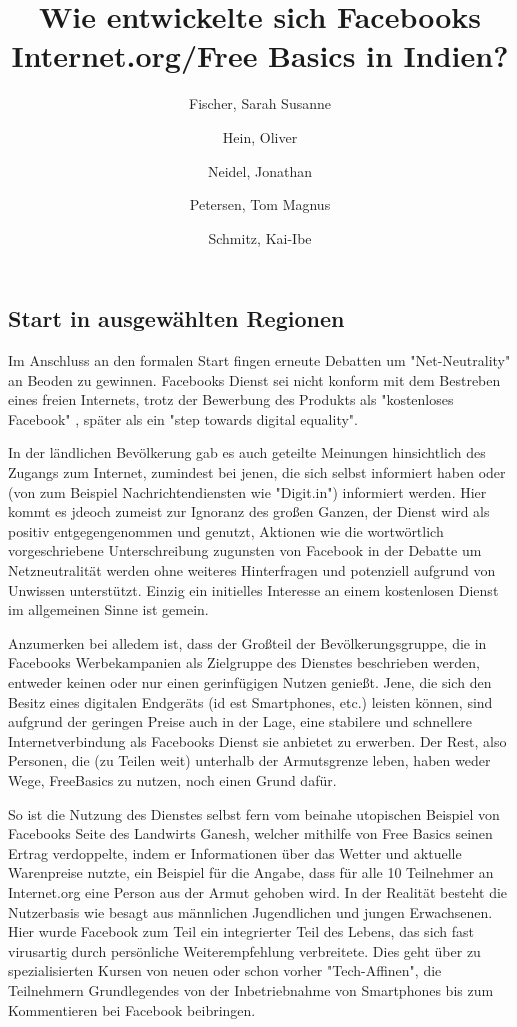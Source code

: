 \documentclass{article}
\title{Wie entwickelte sich Facebooks Internet.org/Free Basics in Indien?}
\author{
  Fischer, Sarah Susanne\\
  \and
  Hein, Oliver\\
  \and
  Neidel, Jonathan\\
  \and
  Petersen, Tom Magnus\\
  \and
  Schmitz, Kai-Ibe\\
}
\begin{document}
\maketitle
\subsection{Start in ausgewählten Regionen}

Im Anschluss an den formalen Start fingen erneute Debatten um "Net-Neutrality" an Beoden zu gewinnen. Facebooks Dienst sei nicht konform mit dem Bestreben eines freien Internets, trotz der Bewerbung des Produkts als "kostenloses Facebook"\cite[3]{prasad2017}
 , später als ein "step towards digital equality".

\medskip

In der ländlichen Bevölkerung gab es auch geteilte Meinungen hinsichtlich des Zugangs zum Internet, zumindest bei jenen, die sich selbst informiert haben oder (von zum Beispiel Nachrichtendiensten wie "Digit.in") \textcite{digitYT}
informiert werden. Hier kommt es jdeoch zumeist zur Ignoranz des großen Ganzen, der Dienst wird als positiv entgegengenommen und genutzt, Aktionen wie die wortwörtlich vorgeschriebene Unterschreibung zugunsten von Facebook in der Debatte um Netzneutralität \textcite{ndtvYT}
werden ohne weiteres Hinterfragen und potenziell aufgrund von Unwissen unterstützt. Einzig ein initielles Interesse an einem kostenlosen Dienst im allgemeinen Sinne ist gemein.

\medskip

Anzumerken bei alledem ist, dass der Großteil der Bevölkerungsgruppe, die in Facebooks Werbekampanien als Zielgruppe des Dienstes beschrieben werden, entweder keinen oder nur einen gerinfügigen Nutzen genießt. Jene, die sich den Besitz eines digitalen Endgeräts (id est Smartphones, etc.) leisten können, sind aufgrund der geringen Preise auch in der Lage, eine stabilere und schnellere Internetverbindung als Facebooks Dienst sie anbietet zu erwerben. Der Rest, also Personen, die (zu Teilen weit) unterhalb der Armutsgrenze leben, haben weder Wege, FreeBasics zu nutzen, noch einen Grund dafür. \cite[257]{everydayLife}

\medskip

So ist die Nutzung des Dienstes selbst fern vom beinahe utopischen Beispiel von Facebooks Seite des Landwirts Ganesh, welcher mithilfe von Free Basics seinen Ertrag verdoppelte, indem er Informationen über das Wetter und aktuelle Warenpreise nutzte, ein Beispiel für die Angabe, dass für alle 10 Teilnehmer an Internet.org eine Person aus der Armut gehoben wird. \cite[4]{prasad2017}
In der Realität besteht die Nutzerbasis wie besagt aus männlichen Jugendlichen und jungen Erwachsenen. Hier wurde Facebook zum Teil ein integrierter Teil des Lebens, das sich fast virusartig durch persönliche Weiterempfehlung verbreitete. Dies geht über zu spezialisierten Kursen von neuen oder schon vorher "Tech-Affinen", die Teilnehmern Grundlegendes von der Inbetriebnahme von Smartphones bis zum Kommentieren bei Facebook beibringen. \cite{empowermentThroughFacebook}
\end{document}

